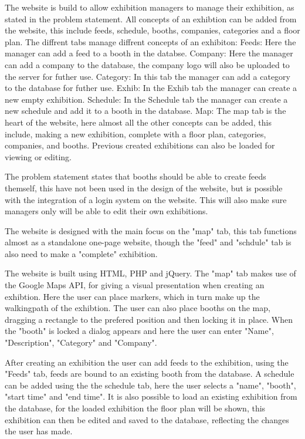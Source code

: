 The website is build to allow exhibition managers to manage their exhibition, as stated in the problem statement. All concepts of an exhibtion can be added from the website, this include feeds, schedule, booths, companies, categories and a floor plan.
The diffrent tabs manage diffrent concepts of an exhibiton:
Feeds: Here the manager can add a feed to a booth in the databse.
Company: Here the manager can add a company to the database, the company logo will also be uploaded to the server for futher use.
Category: In this tab the manager can add a category to the database for futher use.
Exhib: In the Exhib tab the manager can create a new empty exhibition.
Schedule: In the Schedule tab the manager can create a new schedule and add it to a booth in the database.
Map: The map tab is the heart of the website, here almost all the other concepts can be added, this include, making a new exhibition, complete with a floor plan, categories, companies, and booths. Previous created exhibitions can also be loaded for viewing or editing.

The problem statement states that booths should be able to create feeds themself, this have not been used in the design of the website, but is possible with the integration of a login system on the website. This will also make sure managers only will be able to edit their own exhibitions.

The website is designed with the main focus on the "map" tab, this tab functions almost as a standalone one-page website, though the "feed" and "schdule" tab is also need to make a "complete" exhibition.

The website is built using HTML, PHP and jQuery. The "map" tab makes use of the Google Maps API, for giving a visual presentation when creating an exhibtion.
Here the user can place markers, which in turn make up the walkingpath of the exhibtion. The user can also place booths on the map, dragging a rectangle to the prefered position and then locking it in place. When the "booth" is locked a dialog appears and here the user can enter "Name", "Description", "Category" and "Company".

After creating an exhibition the user can add feeds to the exhibition, using the "Feeds" tab, feeds are bound to an existing booth from the database. A schedule can be added using the the schedule tab, here the user selects a "name", "booth", "start time" and "end time".
It is also possible to load an existing exhibition from the database, for the loaded exhibition the floor plan will be shown, this exhibition can then be edited and saved to the database, reflecting the changes the user has made.

